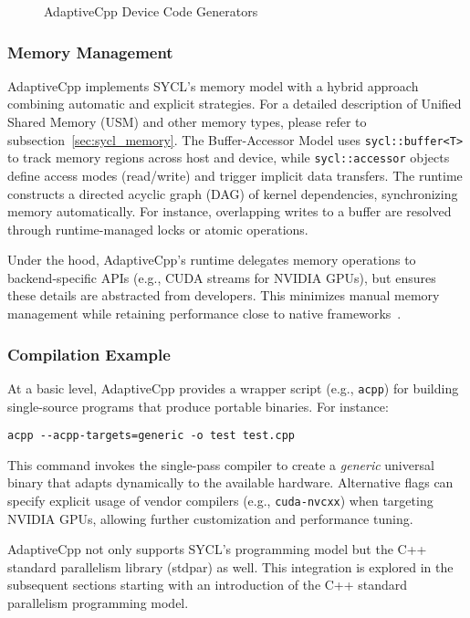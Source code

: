 \begin{figure}[h]
    \centering
    
    \caption{AdaptiveCpp Device Code Generators~\cite{GitAdaptiveCpp}}
    \label{fig:acpp_runtime}
\end{figure}

\subsubsection*{Memory Management}

AdaptiveCpp implements SYCL’s memory model with a hybrid approach combining automatic and explicit strategies.
For a detailed description of Unified Shared Memory (USM) and other memory types, please refer to 
subsection~\ref{sec:sycl_memory}. The Buffer-Accessor Model uses \texttt{sycl::buffer<T>} to track memory 
regions across host and device, while \texttt{sycl::accessor} objects define access modes (read/write) and 
trigger implicit data transfers. The runtime constructs a directed acyclic graph (DAG) of kernel dependencies, 
synchronizing memory automatically. For instance, overlapping writes to a buffer are resolved through 
runtime-managed locks or atomic operations.

Under the hood, AdaptiveCpp’s runtime delegates memory operations to backend-specific APIs (e.g., CUDA streams 
for NVIDIA GPUs), but ensures these details are abstracted from developers. This minimizes manual memory 
management while retaining performance close to native frameworks~\cite{SYCL2020}.

\subsubsection*{Compilation Example}

At a basic level, AdaptiveCpp provides a wrapper script (e.g., \texttt{acpp}) for building single-source programs
that produce portable binaries. For instance:

\begin{verbatim}
acpp --acpp-targets=generic -o test test.cpp
\end{verbatim}

This command invokes the single-pass compiler to create a \textit{generic} universal binary that adapts 
dynamically to the available hardware. Alternative flags can specify explicit usage of vendor compilers 
(e.g., \texttt{cuda-nvcxx}) when targeting NVIDIA GPUs, allowing further customization and performance tuning.

AdaptiveCpp not only supports SYCL’s programming model but the C++ standard parallelism library (stdpar) as well.
This integration is explored in the subsequent sections starting with an introduction of the C++ standard parallelism programming model.
